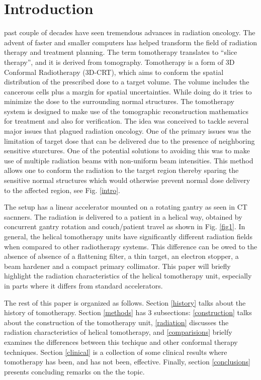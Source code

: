 \documentclass[10pt,journal,compsoc]{IEEEtran} %
\begin{document}
  \section{Introduction}
	 past couple of decades have seen tremendous advances in 
	radiation oncology. The advent of faster and smaller computers has helped 
	transform the field of radiation therapy and treatment planning. The term 
	tomotherapy translates to ``slice therapy'', and it is derived from 
	tomography. Tomotherapy is a form of 3D Conformal Radiotherapy (3D-CRT), 
  which aims to conform the spatial distribution of the prescribed dose to a 
  target volume. The volume includes the cancerous cells plus a margin for 
  spatial uncertainties. While doing do it tries to minimize the dose to the
  surrounding normal structures. The tomotherapy system is designed to make use 
  of the tomographic 	reconstruction mathematics for treatment and also for 
  verification. The idea 	was conceived to tackle several major issues that 
  plagued radiation oncology. One of the primary issues was the limitation of 
  target dose that can be 	delivered due to the presence of neighboring 
  sensitive sturctures. One of the 	potential solutions to avoiding this was 
  to make use of multiple radiation 	beams with non-uniform beam intensities. 
  This method allows one to conform 	the radiation to the target region 
  thereby   sparing the sensitive normal 	structures which would otherwise 
  prevent   normal dose delivery to the affected 	region, see Fig. \ref{intro}.
  
  The setup has a 
  linear accelerator mounted on a rotating gantry as seen in CT 
  sacnners. The radiation is delivered to a patient in a helical way, obtained 
  by concurrent gantry rotation and couch/patient travel as shown in Fig. 
  \ref{fig1}. In general, the helical tomotherapy units have significantly 
  different radiation fields when compared to other radiotherapy systems. This 
  difference can be owed to the absence of absence of a flattening filter, a 
  thin target, an electron stopper, a beam hardener and a compact primary 
  collimator. This paper will briefly highlight the 
  radiation characteristics of the helical tomotherapy unit, especially in 
  parts where it differs from standard accelerators.
  
  The rest of this paper is 
  organized as follows. Section \ref{history} talks 
  about the history of tomotherapy. Section \ref{methods} has 3 subsections: 
  \ref{construction} talks about the construction of the tomotherapy unit, 
  \ref{radiation} discusses the radiation characteristics of helical 
  tomotherapy, and \ref{comparisions} brielfy examines the differences between 
  this techique and other conformal therapy techniques. Section \ref{clinical} 
  is a collection of some clinical results where tomotherapy has been, and has 
  not been, effective. Finally, section \ref{conclusions} presents concluding 
  remarks on the the topic. 
  
\end{document}
